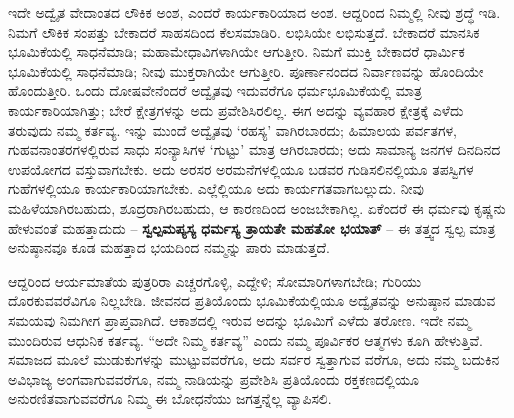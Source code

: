 ಇದೇ ಅದ್ವೈತ ವೇದಾಂತದ ಲೌಕಿಕ ಅಂಶ, ಎಂದರೆ ಕಾರ್ಯಕಾರಿಯಾದ ಅಂಶ. ಆದ್ದರಿಂದ ನಿಮ್ಮಲ್ಲಿ ನೀವು ಶ್ರದ್ಧೆ ಇಡಿ. ನಿಮಗೆ ಲೌಕಿಕ ಸಂಪತ್ತು ಬೇಕಾದರೆ ಸಾಹಸದಿಂದ ಕೆಲಸಮಾಡಿರಿ. ಲಭಿಸಿಯೇ ಲಭಿಸುತ್ತದೆ. ಬೇಕಾದರೆ ಮಾನಸಿಕ ಭೂಮಿಕೆಯಲ್ಲಿ ಸಾಧನೆಮಾಡಿ; ಮಹಾಮೇಧಾವಿಗಳಾಗಿಯೇ ಆಗುತ್ತೀರಿ. ನಿಮಗೆ ಮುಕ್ತಿ ಬೇಕಾದರೆ ಧಾರ್ಮಿಕ ಭೂಮಿಕೆಯಲ್ಲಿ ಸಾಧನೆಮಾಡಿ; ನೀವು ಮುಕ್ತರಾಗಿಯೇ ಆಗುತ್ತೀರಿ. ಪೂರ್ಣಾನಂದದ ನಿರ್ವಾಣವನ್ನು ಹೊಂದಿಯೇ ಹೊಂದುತ್ತೀರಿ. ಒಂದು ದೋಷವೇನೆಂದರೆ ಅದ್ವೈತವು ಇದುವರೆಗೂ ಧರ್ಮಭೂಮಿಕೆಯಲ್ಲಿ ಮಾತ್ರ ಕಾರ್ಯಕಾರಿಯಾಗಿತ್ತು; ಬೇರೆ ಕ್ಷೇತ್ರಗಳನ್ನು ಅದು ಪ್ರವೇಶಿಸಿರಲಿಲ್ಲ. ಈಗ ಅದನ್ನು ವ್ಯವಹಾರ ಕ್ಷೇತ್ರಕ್ಕೆ ಎಳೆದು ತರುವುದು ನಮ್ಮ ಕರ್ತವ್ಯ. ಇನ್ನು ಮುಂದೆ ಅದ್ವೈತವು ‘ರಹಸ್ಯ’ ವಾಗಿರಬಾರದು; ಹಿಮಾಲಯ ಪರ್ವತಗಳ, ಗುಹವನಾಂತರಗಳಲ್ಲಿರುವ ಸಾಧು ಸಂನ್ಯಾಸಿಗಳ ‘ಗುಟ್ಟು’ ಮಾತ್ರ ಆಗಿರಬಾರದು; ಅದು ಸಾಮಾನ್ಯ ಜನಗಳ ದಿನದಿನದ ಉಪಯೋಗದ ವಸ್ತುವಾಗಬೇಕು. ಅದು ಅರಸರ ಅರಮನೆಗಳಲ್ಲಿಯೂ ಬಡವರ ಗುಡಿಸಲಿನಲ್ಲಿಯೂ ತಪಸ್ವಿಗಳ ಗುಹೆಗಳಲ್ಲಿಯೂ ಕಾರ್ಯಕಾರಿಯಾಗಬೇಕು. ಎಲ್ಲೆಲ್ಲಿಯೂ ಅದು ಕಾರ್ಯಗತವಾಗಬಲ್ಲುದು. ನೀವು ಮಹಿಳೆಯಾಗಿರಬಹುದು, ಶೂದ್ರರಾಗಿರಬಹುದು, ಆ ಕಾರಣದಿಂದ ಅಂಜಬೇಕಾಗಿಲ್ಲ. ಏಕೆಂದರೆ ಈ ಧರ್ಮವು ಕೃಷ್ಣನು ಹೇಳುವಂತೆ ಮಹತ್ತಾದುದು – \textbf{ಸ್ವಲ್ಪಮಪ್ಯಸ್ಯ ಧರ್ಮಸ್ಯ ತ್ರಾಯತೇ ಮಹತೋ ಭಯಾತ್​} – ಈ ತತ್ತ್ವದ ಸ್ವಲ್ಪ ಮಾತ್ರ ಅನುಷ್ಠಾನವೂ ಕೂಡ ಮಹತ್ತಾದ ಭಯದಿಂದ ನಮ್ಮನ್ನು ಪಾರು ಮಾಡುತ್ತದೆ.

\vskip 2pt

ಆದ್ದರಿಂದ ಆರ್ಯಮಾತೆಯ ಪುತ್ರರಿರಾ ಎಚ್ಚರಗೊಳ್ಳಿ, ಎದ್ದೇಳಿ; ಸೋಮಾರಿಗಳಾಗಬೇಡಿ; ಗುರಿಯು ದೊರಕುವವರೆವಿಗೂ ನಿಲ್ಲಬೇಡಿ. ಜೀವನದ ಪ್ರತಿಯೊಂದು ಭೂಮಿಕೆಯಲ್ಲಿಯೂ ಅದ್ವೈತವನ್ನು ಅನುಷ್ಠಾನ ಮಾಡುವ ಸಮಯವು ನಿಮಗೀಗ ಪ್ರಾಪ್ತವಾಗಿದೆ. ಆಕಾಶದಲ್ಲಿ ಇರುವ ಅದನ್ನು ಭೂಮಿಗೆ ಎಳೆದು ತರೋಣ. ಇದೇ ನಮ್ಮ ಮುಂದಿರುವ ಆಧುನಿಕ ಕರ್ತವ್ಯ. “ಅದೇ ನಿಮ್ಮ ಕರ್ತವ್ಯ” ಎಂದು ನಮ್ಮ ಪೂರ್ವಿಕರ ಆತ್ಮಗಳು ಕೂಗಿ ಹೇಳುತ್ತಿವೆ. ಸಮಾಜದ ಮೂಲೆ ಮುಡುಕುಗಳನ್ನು ಮುಟ್ಟುವವರೆಗೂ, ಅದು ಸರ್ವರ ಸ್ವತ್ತಾಗುವ ವರೆಗೂ, ಅದು ನಮ್ಮ ಬದುಕಿನ ಅವಿಭಾಜ್ಯ ಅಂಗವಾಗುವವರೆಗೂ, ನಮ್ಮ ನಾಡಿಯನ್ನು ಪ್ರವೇಶಿಸಿ ಪ್ರತಿಯೊಂದು ರಕ್ತಕಣದಲ್ಲಿಯೂ ಅನುರಣಿತವಾಗುವವರೆಗೂ ನಿಮ್ಮ ಈ ಬೋಧನೆಯು ಜಗತ್ತನ್ನೆಲ್ಲ ವ್ಯಾಪಿಸಲಿ.

\vskip 2pt

